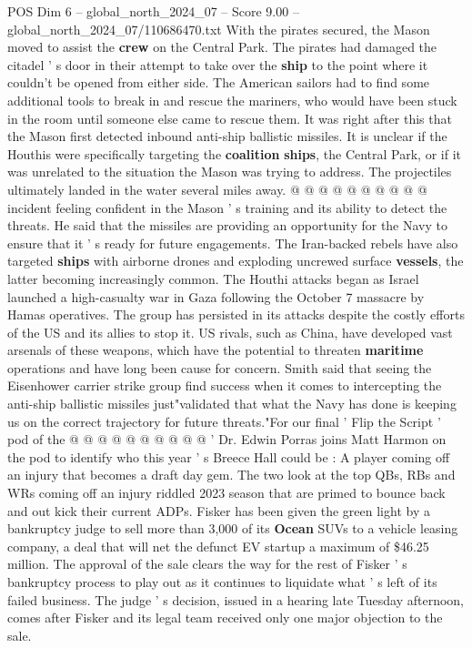 \begin{textsample}{POS Dim 6 – global\_north\_2024\_07 – Score 9.00 – global\_north\_2024\_07/110686470.txt}
With the pirates secured, the Mason moved to assist the \textbf{crew} on the Central Park.
The pirates had damaged the citadel ' s door in their attempt to take over the \textbf{ship} to the point where it couldn't be opened from either side.
The American sailors had to find some additional tools to break in and rescue the mariners, who would have been stuck in the room until someone else came to rescue them.
It was right after this that the Mason first detected inbound anti-ship ballistic missiles.
It is unclear if the Houthis were specifically targeting the \textbf{coalition} \textbf{ships}, the Central Park, or if it was unrelated to the situation the Mason was trying to address.
The projectiles ultimately landed in the water several miles away. @ @ @ @ @ @ @ @ @ @ incident feeling confident in the Mason ' s training and its ability to detect the threats.
He said that the missiles are providing an opportunity for the Navy to ensure that it ' s ready for future engagements.
The Iran-backed rebels have also targeted \textbf{ships} with airborne drones and exploding uncrewed surface \textbf{vessels}, the latter becoming increasingly common.
The Houthi attacks began as Israel launched a high-casualty war in Gaza following the October 7 massacre by Hamas operatives.
The group has persisted in its attacks despite the costly efforts of the US and its allies to stop it.
US rivals, such as China, have developed vast arsenals of these weapons, which have the potential to threaten \textbf{maritime} operations and have long been cause for concern.
Smith said that seeing the Eisenhower carrier strike group find success when it comes to intercepting the anti-ship ballistic missiles just"validated that what the Navy has done is keeping us on the correct trajectory for future threats."For our final ' Flip the Script ' pod of the @ @ @ @ @ @ @ @ @ @ ' Dr.
Edwin Porras joins Matt Harmon on the pod to identify who this year ' s Breece Hall could be : A player coming off an injury that becomes a draft day gem.
The two look at the top QBs, RBs and WRs coming off an injury riddled 2023 season that are primed to bounce back and out kick their current ADPs.
Fisker has been given the green light by a bankruptcy judge to sell more than 3,000 of its \textbf{Ocean} SUVs to a vehicle leasing company, a deal that will net the defunct EV startup a maximum of \$46.25 million.
The approval of the sale clears the way for the rest of Fisker ' s bankruptcy process to play out as it continues to liquidate what ' s left of its failed business.
The judge ' s decision, issued in a hearing late Tuesday afternoon, comes after Fisker and its legal team received only one major objection to the sale.

\end{textsample}
